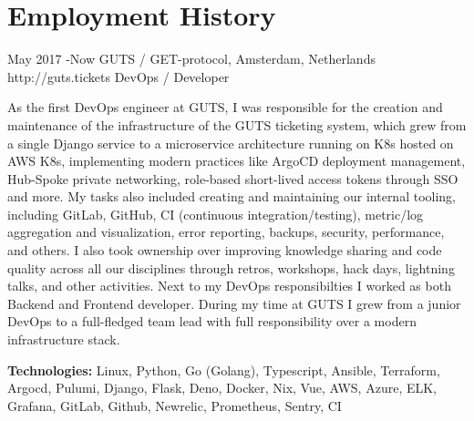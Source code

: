 \documentclass[10pt]{article} %
\begin{document}




\section{Employment History}

\job
{May 2017 -}{Now}
{GUTS / GET-protocol, Amsterdam, Netherlands}
{http://guts.tickets}
{DevOps / Developer}
{As the first DevOps engineer at GUTS, I was responsible for the creation and maintenance of the infrastructure of the GUTS ticketing system, which grew from a single Django service to a microservice architecture running on K8s hosted on AWS K8s, implementing modern practices like ArgoCD deployment management, Hub-Spoke private networking, role-based short-lived access tokens through SSO and more. My tasks also included creating and maintaining our internal tooling, including GitLab, GitHub, CI (continuous integration/testing), metric/log aggregation and visualization, error reporting, backups, security, performance, and others. I also took ownership over improving knowledge sharing and code quality across all our disciplines through retros, workshops, hack days, lightning talks, and other activities. Next to my DevOps responsibilties I worked as both Backend and Frontend developer. During my time at GUTS I grew from a junior DevOps to a full-fledged team lead with full responsibility over a modern infrastructure stack.

\rule{0mm}{5mm}\textbf{Technologies:} Linux, Python, Go (Golang), Typescript, Ansible, Terraform, Argocd, Pulumi, Django, Flask, Deno, Docker, Nix, Vue, AWS, Azure, ELK, Grafana, GitLab, Github, Newrelic, Prometheus, Sentry, CI}
\end{document}
